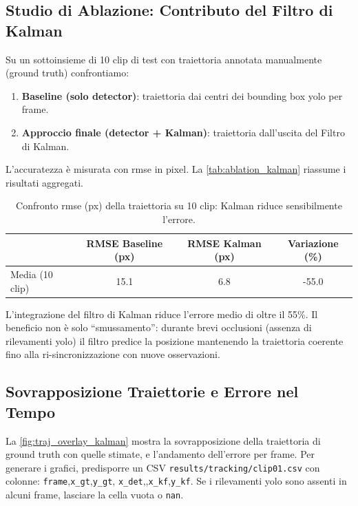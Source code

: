 \documentclass[12pt,a4paper,openright,twoside]{book}
\begin{document}
\subsection{Studio di Ablazione: Contributo del Filtro di Kalman}

Su un sottoinsieme di 10 clip di test con traiettoria annotata 
manualmente (ground truth) confrontiamo:
\begin{enumerate}
  \item \textbf{Baseline (solo detector)}: traiettoria 
  dai centri dei bounding box \ac{yolo} per frame.
  \item \textbf{Approccio finale (detector + Kalman)}: 
  traiettoria dall'uscita del Filtro di Kalman.
\end{enumerate}
L'accuratezza è misurata con \ac{rmse} in pixel. 
La \autoref{tab:ablation_kalman} riassume i risultati aggregati.

\begin{table}[t]
  \centering
  \caption{Confronto \ac{rmse} (px) della traiettoria su 10 clip: 
  Kalman riduce sensibilmente l'errore.}
  \label{tab:ablation_kalman}
  \begin{tabular}{l S[table-format=2.1] 
    S[table-format=2.1] S[table-format=2.1]}
    \toprule
    & {\textbf{RMSE Baseline (px)}} & {\textbf{RMSE Kalman (px)}} 
    & {\textbf{Variazione (\%)}} \\
    \midrule
    Media (10 clip) & 15.1 & 6.8 & -55.0 \\
    \bottomrule
  \end{tabular}
\end{table}

L'integrazione del filtro di Kalman riduce l'errore medio di oltre il 55\%. 
Il beneficio non è solo ``smussamento'': durante brevi occlusioni 
(assenza di rilevamenti \ac{yolo}) il filtro predice la posizione 
mantenendo la traiettoria coerente fino alla ri-sincronizzazione 
con nuove osservazioni.

\subsection{Sovrapposizione Traiettorie e Errore nel Tempo}
\label{sec:traiettoria-errore-tempo}

La \autoref{fig:traj_overlay_kalman} mostra la sovrapposizione 
della traiettoria di ground truth con quelle stimate, e 
l'andamento dell'errore per frame.
Per generare i grafici, predisporre un CSV 
\texttt{results/tracking/clip01.csv} con colonne:
\texttt{frame},\texttt{x\_gt},\texttt{y\_gt},
\texttt{x\_det},\texttt{},\texttt{x\_kf},\texttt{y\_kf}. 
Se i rilevamenti \ac{yolo} sono assenti in alcuni frame, 
lasciare la cella vuota o \texttt{nan}.
\end{document}
